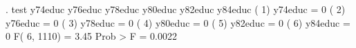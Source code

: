 . test y74educ y76educ y78educ y80educ y82educ y84educ
{\smallskip}
 ( 1)  y74educ = 0
 ( 2)  y76educ = 0
 ( 3)  y78educ = 0
 ( 4)  y80educ = 0
 ( 5)  y82educ = 0
 ( 6)  y84educ = 0
{\smallskip}
       F(  6,  1110) =    3.45
            Prob > F =    0.0022
{\smallskip}
